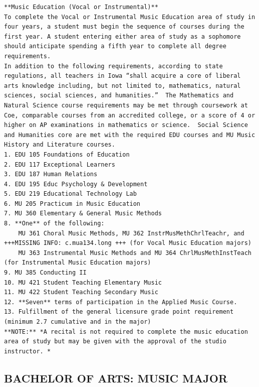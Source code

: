 \documentclass[
  letterpaper,
]{scrbook}
\begin{document}
\begin{verbatim}
**Music Education (Vocal or Instrumental)**
To complete the Vocal or Instrumental Music Education area of study in four years, a student must begin the sequence of courses during the first year. A student entering either area of study as a sophomore should anticipate spending a fifth year to complete all degree requirements. 
In addition to the following requirements, according to state regulations, all teachers in Iowa “shall acquire a core of liberal arts knowledge including, but not limited to, mathematics, natural sciences, social sciences, and humanities.”  The Mathematics and Natural Science course requirements may be met through coursework at Coe, comparable courses from an accredited college, or a score of 4 or higher on AP examinations in mathematics or science.  Social Science and Humanities core are met with the required EDU courses and MU Music History and Literature courses.
1. EDU 105 Foundations of Education
2. EDU 117 Exceptional Learners
3. EDU 187 Human Relations
4. EDU 195 Educ Psychology & Development
5. EDU 219 Educational Technology Lab
6. MU 205 Practicum in Music Education
7. MU 360 Elementary & General Music Methods
8. **One** of the following:
    MU 361 Choral Music Methods, MU 362 InstrMusMethChrlTeachr, and +++MISSING INFO: c.mua134.long +++ (for Vocal Music Education majors)
    MU 363 Instrumental Music Methods and MU 364 ChrlMusMethInstTeach (for Instrumental Music Education majors)
9. MU 385 Conducting II
10. MU 421 Student Teaching Elementary Music
11. MU 422 Student Teaching Secondary Music
12. **Seven** terms of participation in the Applied Music Course.
13. Fulfillment of the general licensure grade point requirement (minimum 2.7 cumulative and in the major) 
**NOTE:** *A recital is not required to complete the music education area of study but may be given with the approval of the studio instructor. *
\end{verbatim}

\hypertarget{bachelor-of-arts-music-major}{%
\subsection{BACHELOR OF ARTS: MUSIC
MAJOR}\label{bachelor-of-arts-music-major}}
\end{document}
